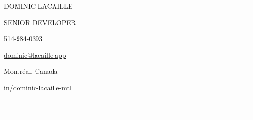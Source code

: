 \documentclass{article}
\begin{document}

\thispagestyle{empty}

\noindent
\begin{minipage}[m]{12cm}
  \vspace{0.5em}
  {\fontsize{33}{33}\noindent\selectfont\uppercase{Dominic Lacaille}\par}
  \vspace{1em}
  {\noindent\large\trackingwide\uppercase{Senior Developer}\par}
\end{minipage}
\hfill
\begin{minipage}[m]{4.5cm}
  {\faPhone*\hspace{1.5em}\href{tel:15149840393}{514-984-0393}\par}
  \vspace{0.3em}
  {\faEnvelope\hspace{1.5em}\href{mailto:dominic@lacaille.app}{dominic@lacaille.app}\par}
  \vspace{0.3em}
  {\faCanadianMapleLeaf\hspace{1.5em}Montréal, Canada\par}
  \vspace{0.3em}
  {\faLinkedin\hspace{1.5em}\href{https://linkedin.com/in/dominic-lacaille-mtl}{in/dominic-lacaille-mtl}\par}
\end{minipage}

\

\par\noindent\rule{\textwidth}{0.4pt}

\vspace{3em}
\end{document}
